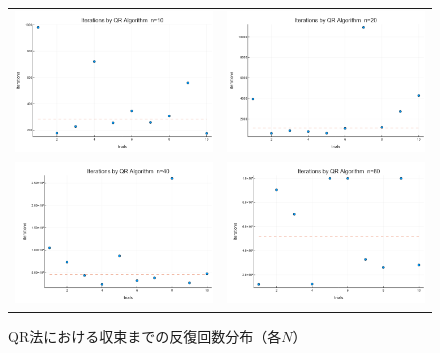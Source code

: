\documentclass[a4paper,11pt]{ltjsarticle}
\begin{document}
\begin{figure}[H]
  \centering
  \begin{tabular}{cc}
    \includegraphics[width=72mm]{graphs/exp5_n10_iterations.png} &
    \includegraphics[width=72mm]{graphs/exp5_n20_iterations.png} \\
    \includegraphics[width=72mm]{graphs/exp5_n40_iterations.png} &
    \includegraphics[width=72mm]{graphs/exp5_n80_iterations.png} \\
  \end{tabular}
  \caption{QR法における収束までの反復回数分布（各$N$）}
  \label{fig:exp5_iterations}
\end{figure}
\end{document}
